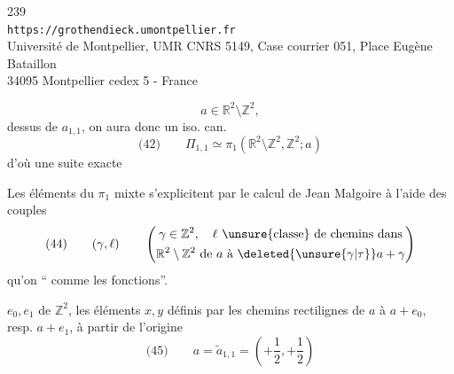 \begin{center}
239\\
\texttt{https://grothendieck.umontpellier.fr}\\
Université de Montpellier, UMR CNRS 5149, Case courrier 051, Place Eugène Bataillon\\
34095 Montpellier cedex 5 - France
\end{center}


\[
a\in\mathbb R^2\setminus\mathbb Z^2,
\]
 dessus de $a_{1,1}$, on aura donc un iso. can.
\[
\text{(42)}\qquad
\Pi_{1,1}\simeq\pi_1(\mathbb R^2\setminus\mathbb Z^2,\mathbb Z^2;a)
\]
d'où une suite exacte

Les éléments du $\pi_1$ mixte s'explicitent par le calcul de Jean Malgoire à l'aide des couples
\[
\text{(44)}\qquad
(\gamma,\ell)\qquad
\left(\begin{gathered}
\gamma\in\mathbb Z^2,\quad \ell\ \text{\unsure{classe} de chemins dans}\\
\mathbb R^2\setminus\mathbb Z^2\ \text{de }a\text{ à }\deleted{\unsure{\gamma|\tau}}a+\gamma
\end{gathered}\right)
\]
qu'on `` comme les fonctions''.

$e_0,e_1$ de $\mathbb Z^2$, les éléments $x,y$ définis par les chemins rectilignes de $a$ à $a+e_0$, resp. $a+e_1$, à partir de l'origine
\[
\text{(45)}\qquad
 a=\widetilde a_{1,1}=\left(+\frac12,+\frac12\right)
\]

